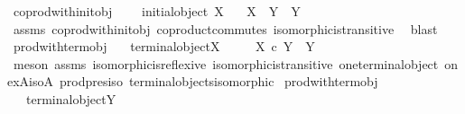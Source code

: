 \begin{isabellebody}
\endisatagproof
{\isafoldproof}%
%
\isadelimproof
\isanewline
%
\endisadelimproof
\isanewline
{}\isamarkupfalse%
\ coprod{\isacharunderscore}{\kern0pt}with{\isacharunderscore}{\kern0pt}init{\isacharunderscore}{\kern0pt}obj{}{\isacharcolon}{\kern0pt}\ \isanewline
\ \ \ {\isachardoublequoteopen}initial{\isacharunderscore}{\kern0pt}object\ X{\isachardoublequoteclose}\isanewline
\ \ \ {\isachardoublequoteopen}X\ {\isasymCoprod}\ Y\ {\isasymcong}\ Y{\isachardoublequoteclose}\isanewline
%
\isadelimproof
\ \ %
\endisadelimproof
%
\isatagproof
{}\isamarkupfalse%
\ assms\ coprod{\isacharunderscore}{\kern0pt}with{\isacharunderscore}{\kern0pt}init{\isacharunderscore}{\kern0pt}obj{}\ coproduct{\isacharunderscore}{\kern0pt}commutes\ isomorphic{\isacharunderscore}{\kern0pt}is{\isacharunderscore}{\kern0pt}transitive\ \isamarkupfalse%
\ blast%
\endisatagproof
{\isafoldproof}%
%
\isadelimproof
\isanewline
%
\endisadelimproof
\isanewline
{}\isamarkupfalse%
\ prod{\isacharunderscore}{\kern0pt}with{\isacharunderscore}{\kern0pt}term{\isacharunderscore}{\kern0pt}obj{}{\isacharcolon}{\kern0pt}\isanewline
\ \ \ {\isachardoublequoteopen}terminal{\isacharunderscore}{\kern0pt}object{\isacharparenleft}{\kern0pt}X{\isacharparenright}{\kern0pt}{\isachardoublequoteclose}\ \isanewline
\ \ \ \ {\isachardoublequoteopen}X\ {\isasymtimes}\isactrlsub c\ Y\ {\isasymcong}\ Y{\isachardoublequoteclose}\ \isanewline
%
\isadelimproof
\ \ %
\endisadelimproof
%
\isatagproof
{}\isamarkupfalse%
\ {\isacharparenleft}{\kern0pt}meson\ assms\ isomorphic{\isacharunderscore}{\kern0pt}is{\isacharunderscore}{\kern0pt}reflexive\ isomorphic{\isacharunderscore}{\kern0pt}is{\isacharunderscore}{\kern0pt}transitive\ one{\isacharunderscore}{\kern0pt}terminal{\isacharunderscore}{\kern0pt}object\ one{\isacharunderscore}{\kern0pt}x{\isacharunderscore}{\kern0pt}A{\isacharunderscore}{\kern0pt}iso{\isacharunderscore}{\kern0pt}A\ prod{\isacharunderscore}{\kern0pt}pres{\isacharunderscore}{\kern0pt}iso\ terminal{\isacharunderscore}{\kern0pt}objects{\isacharunderscore}{\kern0pt}isomorphic{\isacharparenright}{\kern0pt}%
\endisatagproof
{\isafoldproof}%
%
\isadelimproof
\isanewline
%
\endisadelimproof
\isanewline
{}\isamarkupfalse%
\ prod{\isacharunderscore}{\kern0pt}with{\isacharunderscore}{\kern0pt}term{\isacharunderscore}{\kern0pt}obj{}{\isacharcolon}{\kern0pt}\isanewline
\ \ \ {\isachardoublequoteopen}terminal{\isacharunderscore}{\kern0pt}object{\isacharparenleft}{\kern0pt}Y{\isacharparenright}{\kern0pt}{\isachardoublequoteclose}\ \isanewline

\end{isabellebody}
